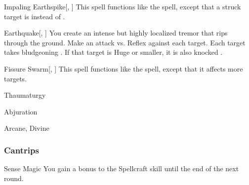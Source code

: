 \lowercase{\hypertarget{spell:Impaling Earthspike}{}}\label{spell:Impaling Earthspike}
\begin{freeability}[Rank 5]{\hypertarget{spell:Impaling Earthspike}{Impaling Earthspike}}[, ]
This spell functions like the  spell, except that a struck target is  instead of .
\end{freeability}
\vspace{0.25em}



\lowercase{\hypertarget{spell:Earthquake}{}}\label{spell:Earthquake}
\begin{freeability}[Rank 7]{\hypertarget{spell:Earthquake}{Earthquake}}[, ]
You create an intense but highly localized tremor that rips through the ground.
Make an attack vs. Reflex against each target.
\hit Each target takes bludgeoning .
If that target is Huge or smaller, it is also knocked .
\end{freeability}
\vspace{0.25em}



\lowercase{\hypertarget{spell:Fissure Swarm}{}}\label{spell:Fissure Swarm}
\begin{freeability}[Rank 8]{\hypertarget{spell:Fissure Swarm}{Fissure Swarm}}[, ]
This spell functions like the  spell, except that it affects more targets.
\end{freeability}
\vspace{0.25em}


\newpage
\begin{spellsection}{Thaumaturgy}

\begin{spellheader}
\end{spellheader}


 Abjuration

 Arcane, Divine

\subsubsection{Cantrips}


\begin{freeability}{Sense Magic}
You gain a  bonus to the Spellcraft skill until the end of the next round.
\end{freeability}

\end{spellsection}


